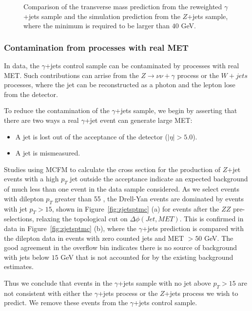 \begin{figure}[!htbp]
\begin{center}
\caption{Comparison of the transverse mass prediction from the reweighted $\gamma$+jets sample 
and the simulation prediction from the $Z$+jets sample, where the minimum \met is required to be larger than 
$40$ GeV.}
\label{fig:PhotonJetsClosureTest_MtHZZ_MetPresel}
\end{center}
\end{figure}

\subsubsection{Contamination from processes with real MET}
\label{sec:zjets_contamination}

In data, the $\gamma$+jets
control sample can be contaminated by processes with real MET.
Such contributions can arrise from the $Z\rightarrow\nu\nu+\gamma$ process or
the $W+jets$ processes, where the jet can be reconstructed as a photon and the lepton
lose from the detector.

To reduce the contamination of the $\gamma$+jets sample,
we begin by asserting that there are two
ways a real $\gamma$+jet event can generate large MET:

\begin{itemize}
    \item A jet is lost out of the acceptance of the detector ($|\eta| > 5.0$).
    \item A jet is mismeasured.
\end{itemize}

Studies using MCFM to calculate the cross section for the production of
$Z$+jet events with a high $p_T$ jet outside the acceptance indicate
an expected background of much less than one event in the data sample considered.
As we select events with dilepton $p_T$ greater than 55 \GeV, the Drell-Yan events
are dominated by events with jet $p_T>15$\GeV, shown in Figure~\ref{fig:zjetsptmc} (a)
for events after the $ZZ$ pre-selections, relaxing the topological cut on $\Delta\phi(Jet, MET)$.
This is confirmed in data in Figure~\ref{fig:zjetsptmc} (b), where the $\gamma$+jets prediction
is compared with the dilepton data in events with zero counted jets and MET $>50$ GeV.
The good agreement in the overflow bin indicates there is no source of background
with jets below $15$ GeV that is not accounted for by the existing background estimates.

Thus we conclude that events in the $\gamma$+jets sample with no jet above $p_T>15$\GeV
are not consistent with either the $\gamma$+jets process or the $Z$+jets process we wish to predict.
We remove these events from the $\gamma$+jets control sample.

